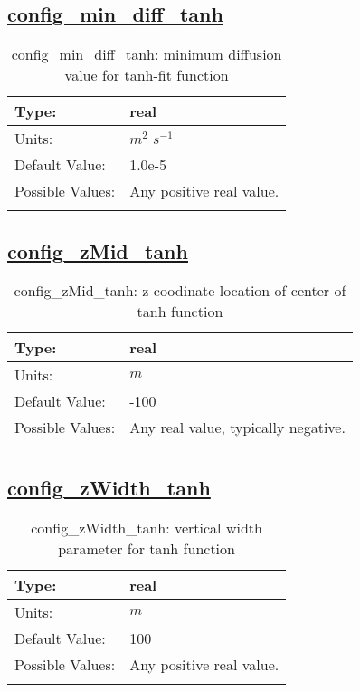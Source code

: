 \subsection[config\_min\_diff\_tanh]{\hyperref[sec:nm_tab_vmix_tanh]{config\_min\_diff\_tanh}}
\label{subsec:nm_sec_config_min_diff_tanh}
\begin{center}
\begin{longtable}{| p{2.0in} | p{4.0in} |}
    \hline
    Type: & real \\
    \hline
    Units: & $m^2$ $s^{-1}$ \\
    \hline
    Default Value: & 1.0e-5 \\
    \hline
    Possible Values: & Any positive real value. \\
    \hline
    \caption{config\_min\_diff\_tanh: minimum diffusion value for tanh-fit function}
\end{longtable}
\end{center}
\subsection[config\_zMid\_tanh]{\hyperref[sec:nm_tab_vmix_tanh]{config\_zMid\_tanh}}
\label{subsec:nm_sec_config_zMid_tanh}
\begin{center}
\begin{longtable}{| p{2.0in} | p{4.0in} |}
    \hline
    Type: & real \\
    \hline
    Units: & $m$ \\
    \hline
    Default Value: & -100 \\
    \hline
    Possible Values: & Any real value, typically negative. \\
    \hline
    \caption{config\_zMid\_tanh: z-coodinate location of center of tanh function}
\end{longtable}
\end{center}
\subsection[config\_zWidth\_tanh]{\hyperref[sec:nm_tab_vmix_tanh]{config\_zWidth\_tanh}}
\label{subsec:nm_sec_config_zWidth_tanh}
\begin{center}
\begin{longtable}{| p{2.0in} | p{4.0in} |}
    \hline
    Type: & real \\
    \hline
    Units: & $m$ \\
    \hline
    Default Value: & 100 \\
    \hline
    Possible Values: & Any positive real value. \\
    \hline
    \caption{config\_zWidth\_tanh: vertical width parameter for tanh function}
\end{longtable}
\end{center}
